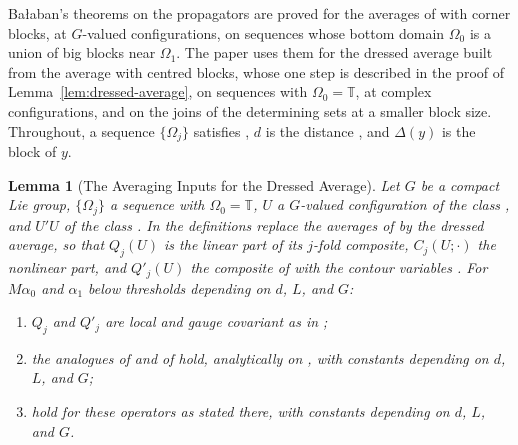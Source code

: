 \documentclass[11pt]{preprint}
\numberwithin{equation}{section}
\newtheorem{lemma}{Lemma}[section]
\theoremstyle{definition}
\theoremstyle{remark}
\theoremstyle{plain}
\begin{document}
Ba{\l}aban's theorems on the propagators \cite[Sects.~A--D]{BalabanPBG} are proved for the averages of \cite{BalabanAVG} with corner blocks, at $G$-valued configurations, on sequences whose bottom domain $\Omega_0$ is a union of big blocks near $\Omega_1$. The paper uses them for the dressed average built from the average \cite[(0.4)]{BalabanRG1} with centred blocks, whose one step is described in the proof of Lemma~\ref{lem:dressed-average}, on sequences with $\Omega_0 = \mathbb T$, at complex configurations, and on the joins of the determining sets at a smaller block size. Throughout, a sequence $\{\Omega_j\}$ satisfies \cite[(2.1)--(2.4), p.~224]{BalabanPRT2}, $d$ is the distance \cite[(2.46)]{BalabanPRT2}, and $\Delta(y)$ is the block of $y$.

\begin{lemma}[The Averaging Inputs for the Dressed Average]\label{lem:pbg-dressed}
Let $G$ be a compact Lie group, $\{\Omega_j\}$ a sequence with $\Omega_0 = \mathbb T$, $U$ a $G$-valued configuration of the class \cite[(3.35)--(3.36)]{BalabanPBG}, and $U'U$ of the class \cite[(3.37)--(3.38)]{BalabanPBG}. In the definitions \cite[(3.13)--(3.19)]{BalabanPBG} replace the averages of \cite{BalabanAVG} by the dressed average, so that $Q_j(U)$ is the linear part of its $j$-fold composite, $C_j(U; \cdot)$ the nonlinear part, and $Q'_j(U)$ the composite of \cite[(3.19)]{BalabanPBG} with the contour variables \cite[(0.11)]{BalabanRG1}. For $M\alpha_0$ and $\alpha_1$ below thresholds depending on $d$, $L$, and $G$:
\begin{enumerate}[label=(\alph*)]
\item $Q_j$ and $Q'_j$ are local and gauge covariant as in \cite[(3.32); p.~414, ll.~13--15]{BalabanPBG};
\item the analogues of \cite[(143), (149)]{BalabanAVG} and of \cite[(3.58)--(3.59), (3.79)--(3.81)]{BalabanPBG} hold, analytically on \cite[(3.37)]{BalabanPBG}, with constants depending on $d$, $L$, and $G$;
\item \cite[Theorems~3.1--3.13, (3.131)--(3.137), (3.147)--(3.153)]{BalabanPBG} hold for these operators as stated there, with constants depending on $d$, $L$, and $G$.
\end{enumerate}
\end{lemma}
\end{document}
